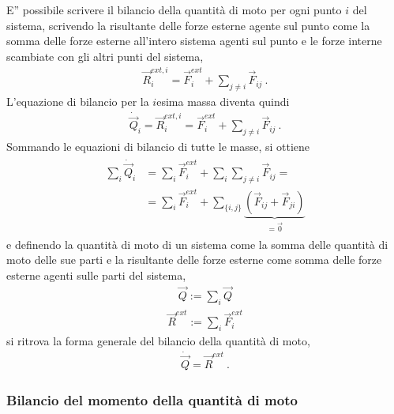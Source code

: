 \documentclass[letterpaper,10pt,italian]{jupyterBook}
\begin{document}
\sphinxAtStartPar
E” possibile scrivere il bilancio della quantità di moto per ogni punto \(i\) del sistema, scrivendo la risultante delle forze esterne agente sul punto come la somma delle forze esterne all’intero sistema agenti sul punto e le forze interne scambiate con gli altri punti del sistema,
\begin{equation*}
\begin{split}\vec{R}_i^{ext,i} = \vec{F}_i^{ext} + \sum_{j \ne i} \vec{F}_{ij} \ .\end{split}
\end{equation*}
\sphinxAtStartPar
L’equazione di bilancio per la \(i\)\sphinxhyphen{}esima massa diventa quindi
\begin{equation*}
\begin{split}\dot{\vec{Q}}_i = \vec{R}_i^{ext,i} = \vec{F}_i^{ext} + \sum_{j \ne i} \vec{F}_{ij} \ .\end{split}
\end{equation*}
\sphinxAtStartPar
Sommando le equazioni di bilancio di tutte le masse, si ottiene
\begin{equation*}
\begin{split}\begin{aligned}
\sum_{i} \dot{\vec{Q}}_i & = \sum_i \vec{F}_{i}^{ext} + \sum_i \sum_{j \ne i} \vec{F}_{ij} = \\
                            & = \sum_i \vec{F}_{i}^{ext} + \sum_{\{i,j\}} \underbrace{\left( \vec{F}_{ij} + \vec{F}_{ji} \right)}_{=\vec{0}} 
\end{aligned}\end{split}
\end{equation*}
\sphinxAtStartPar
e definendo la quantità di moto di un sistema come la somma delle quantità di moto delle sue parti e la risultante delle forze esterne come somma delle forze esterne agenti sulle parti del sistema,
\begin{equation*}
\begin{split}\vec{Q} := \sum_i \vec{Q}\end{split}
\end{equation*}\begin{equation*}
\begin{split}\vec{R}^{ext} := \sum_i \vec{F}_i^{ext}\end{split}
\end{equation*}
\sphinxAtStartPar
si ritrova la forma generale del bilancio della quantità di moto,
\begin{equation*}
\begin{split}\dot{\vec{Q}} = \vec{R}^{ext} \ .\end{split}
\end{equation*}\subsubsection*{Bilancio del momento della quantità di moto}
\end{document}
